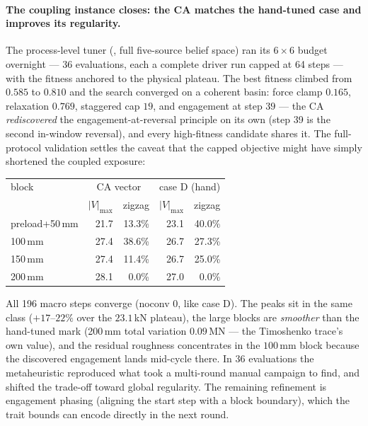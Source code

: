 \paragraph{The coupling instance closes: the CA matches the hand-tuned
case and improves its regularity.} The process-level tuner
(, full five-source belief space) ran its
$6\times 6$ budget overnight --- 36 evaluations, each a complete driver
run capped at 64 steps --- with the fitness anchored to the physical
plateau. The best fitness climbed from $0.585$ to $0.810$ and the
search converged on a coherent basin: force clamp $0.165$, relaxation
$0.769$, staggered cap $19$, and engagement at step $39$ --- the CA
\emph{rediscovered} the engagement-at-reversal principle on its own
(step 39 is the second in-window reversal), and every high-fitness
candidate shares it. The full-protocol validation settles the caveat
that the capped objective might have simply shortened the coupled
exposure:

\begin{center}
\begin{tabular}{@{}lrrrr@{}}
\toprule
block & \multicolumn{2}{c}{CA vector} & \multicolumn{2}{c}{case D
(hand)} \\
 & $|V|_{\max}$ & zigzag & $|V|_{\max}$ & zigzag \\
\midrule
preload+50\,mm & 21.7 & 13.3\% & 23.1 & 40.0\% \\
100\,mm        & 27.4 & 38.6\% & 26.7 & 27.3\% \\
150\,mm        & 27.4 & 11.4\% & 26.7 & 25.0\% \\
200\,mm        & 28.1 &  0.0\% & 27.0 &  0.0\% \\
\bottomrule
\end{tabular}
\end{center}

All 196 macro steps converge (noconv 0, like case D). The peaks sit in
the same class ($+17$--$22\%$ over the $23.1$\,kN plateau), the large
blocks are \emph{smoother} than the hand-tuned mark (200\,mm total
variation $0.09$\,MN --- the Timoshenko trace's own value), and the
residual roughness concentrates in the $100$\,mm block because the
discovered engagement lands mid-cycle there. In 36 evaluations the
metaheuristic reproduced what took a multi-round manual campaign to
find, and shifted the trade-off toward global regularity. The
remaining refinement is engagement phasing (aligning the start step
with a block boundary), which the trait bounds can encode directly in
the next round.
